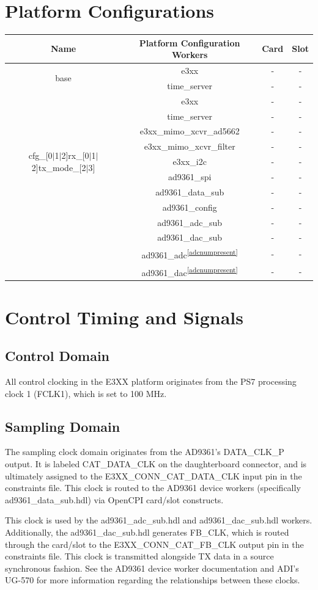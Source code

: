 \documentclass{article}
\def\comp{e3xx}
\def\comp{e3xx}
\begin{document}
\section*{Platform Configurations}
	\begin{tabular}{|c|c|c|c|}
		\hline
		\rowcolor{blue}
		Name & Platform Configuration Workers & Card & Slot \\
		\hline
		\multirow{2}{*}{base} &\comp & - & - \\ &time\_server & - & - \\
		\hline
		\multirow{9}{*}{cfg\_[0$|$1$|$2]rx\_[0$|$1$|$2]tx\_mode\_[2$|$3]} &\comp & - & - \\ &time\_server & - & - \\ &e3xx\_mimo\_xcvr\_ad5662& - & - \\ &e3xx\_mimo\_xcvr\_filter & - & - \\ &e3xx\_i2c & - & - \\ &ad9361\_spi & - & - \\ &ad9361\_data\_sub & - & - \\ &ad9361\_config & - & - \\ &ad9361\_adc\_sub & - & - \\ &ad9361\_dac\_sub & - & - \\ &ad9361\_adc\textsuperscript{\ref{adcnumpresent}} & - & - \\ &ad9361\_dac\textsuperscript{\ref{adcnumpresent}} & - & - \\
		\hline
	\end{tabular}
\section*{Control Timing and Signals}
\subsection*{Control Domain}
All control clocking in the E3XX platform originates from the PS7 processing clock 1 (FCLK1), which is set to 100 MHz.

\subsection*{Sampling Domain}
The sampling clock domain originates from the AD9361's DATA\_CLK\_P output. It is labeled CAT\_DATA\_CLK on the daughterboard connector, and is ultimately assigned to the E3XX\_CONN\_CAT\_DATA\_CLK input pin in the constraints file. This clock is routed to the AD9361 device workers (specifically ad9361\_data\_sub.hdl) via OpenCPI card/slot constructs.\par\medskip
\noindent This clock is used by the ad9361\_adc\_sub.hdl and ad9361\_dac\_sub.hdl workers. Additionally, the ad9361\_dac\_sub.hdl generates FB\_CLK, which is routed through the card/slot to the E3XX\_CONN\_CAT\_FB\_CLK output pin in the constraints file. This clock is transmitted alongside TX data in a source synchronous fashion. See the AD9361 device worker documentation and ADI's UG-570 for more information regarding the relationships between these clocks.
\end{document}
